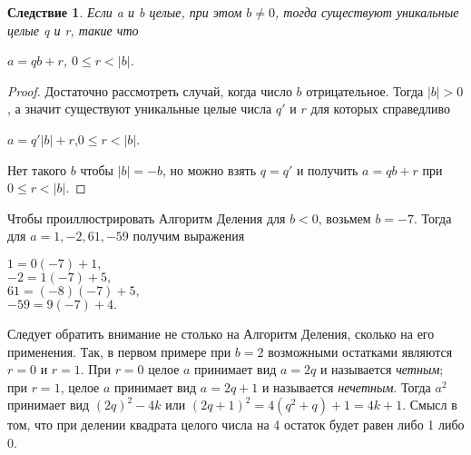 \documentclass[11pt]{article}
\newtheorem*{corollary*}{Следствие}
\begin{document}
\begin{corollary*}
Если a и b целые, при этом $b\neq 0$, тогда существуют уникальные целые q и r, такие что
\begin{flushright}
	$a=qb+r$, \qquad \qquad \qquad \qquad \quad $0\leq r<|b|$.
\end{flushright}
\end{corollary*}

\begin{proof}
Достаточно рассмотреть случай, когда число $b$ отрицательное. Тогда $|b|>0$, а значит существуют уникальные целые числа $q'$ и $r$ для которых справедливо
\begin{flushright}
	$a=q'|b|+r$,\qquad \qquad \qquad \qquad \quad $0\leq r<|b|$.
\end{flushright}
Нет такого $b$ чтобы $|b|=-b$, но можно взять $q=q'$ и получить $a=qb+r$ при $0\leq r<|b|$.
\end{proof}
\qquad \quad \leftskip=-0.9cm \rightskip=-0.9cm \thispagestyle{3} Чтобы проиллюстрировать Алгоритм Деления для $b<0$, возьмем $b=-7$. Тогда для $a=1,-2,61,-59$ получим выражения
\begin{center}
	$1=0(-7)+1,$\\
	$-2=1(-7)+5,$\\
	$61=(-8)(-7)+5,$\\
	$-59=9(-7)+4.$
\end{center}
Следует обратить внимание не столько на Алгоритм Деления, сколько на его применения. Так, в первом примере при $b=2$ возможными остатками являются $r=0$ и $r=1$. При $r=0$ целое $a$ принимает вид $a=2q$ и называется \textit{четным}; при $r=1$, целое $a$ принимает вид $a=2q+1$ и называется \textit{нечетным}. Тогда $a^2$ принимает вид $(2q)^2-4k$ или $(2q+1)^2=4(q^2+q)+1=4k+1$. Смысл в том, что при делении квадрата целого числа на 4 остаток будет равен либо 1 либо 0.
\end{document}
